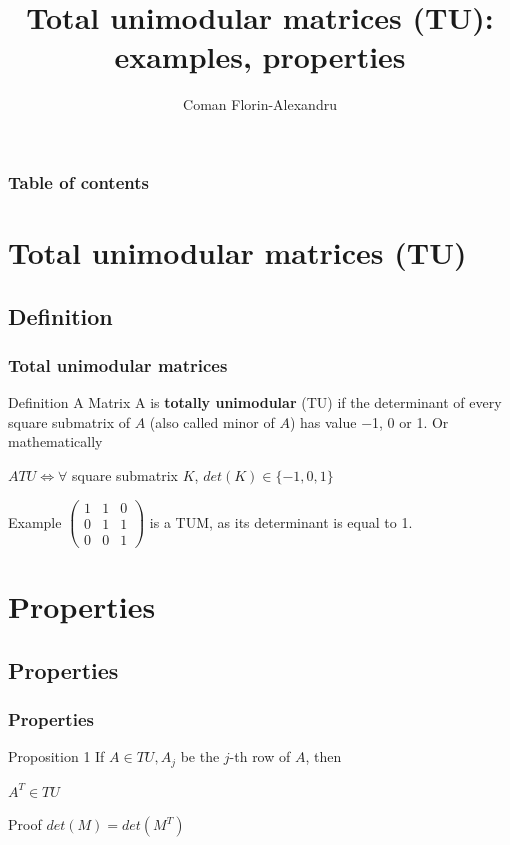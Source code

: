 \documentclass{beamer}
\begin{document}
\title{Total unimodular matrices (TU): examples, properties}  
\author{Coman Florin-Alexandru}

\begin{frame}
\titlepage
\end{frame}

\begin{frame}\frametitle{Table of contents}\tableofcontents
\end{frame}

\section{Total unimodular matrices (TU)}
\subsection{Definition}
\begin{frame}\frametitle{Total unimodular matrices}
\begin{block}{Definition}
A Matrix A is \textbf{totally unimodular} (TU) if the determinant of every square submatrix of $A$ (also called minor of $A$) has value −1, 0 or 1. Or mathematically \\
\centerline{$A TU \Longleftrightarrow \forall$ square submatrix $K$, $det(K) \in \lbrace -1, 0, 1 \rbrace$}
\end{block}
\begin{block}{Example}
$\begin{pmatrix}
1& 1& 0 \\
0& 1& 1 \\
0& 0& 1
\end{pmatrix}$ is a TUM, as its determinant is equal to 1.
\end{block}
\end{frame}

\section{Properties}
\subsection{Properties}
\begin{frame}\frametitle{Properties}
\begin{block}{Proposition 1}
If $A \in TU, A_j$ be the $j$-th row of $A$, then \\
\centerline{$A^T \in TU$}
\end{block}
\begin{block}{Proof}
$det(M) = det(M^T)$
\end{block}
\end{frame}
\end{document}
